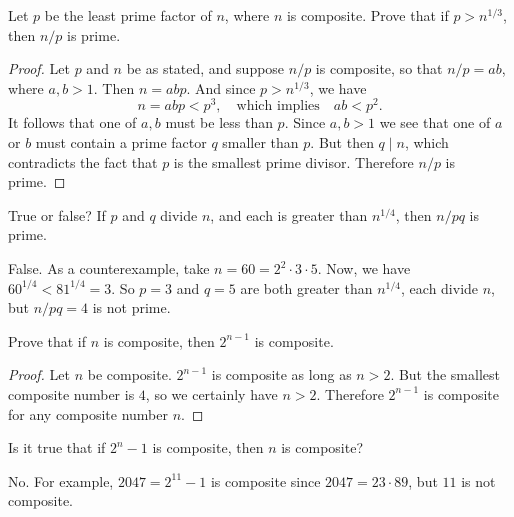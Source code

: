  Let $p$ be the least prime factor of $n$, where $n$ is
composite. Prove that if $p > n^{1/3}$, then $n/p$ is prime.
\begin{proof}
  Let $p$ and $n$ be as stated, and suppose $n/p$ is composite, so
  that $n/p = ab$, where $a,b > 1$. Then $n = abp$. And since
  $p > n^{1/3}$, we have
  \begin{equation*}
    n = abp < p^3,
    \quad\text{which implies}\quad
    ab < p^2.
  \end{equation*}
  It follows that one of $a,b$ must be less than $p$. Since $a,b > 1$
  we see that one of $a$ or $b$ must contain a prime factor $q$
  smaller than $p$. But then $q\mid n$, which contradicts the fact
  that $p$ is the smallest prime divisor. Therefore $n/p$ is prime.
\end{proof}

 True or false? If $p$ and $q$ divide $n$, and each is
greater than $n^{1/4}$, then $n/pq$ is prime.
\begin{solution}
  False. As a counterexample, take $n = 60 = 2^2\cdot3\cdot5$. Now, we
  have $60^{1/4} < 81^{1/4} = 3$. So $p = 3$ and $q = 5$ are both
  greater than $n^{1/4}$, each divide $n$, but $n/pq = 4$ is not
  prime.
\end{solution}

 Prove that if $n$ is composite, then $2^{n-1}$ is
composite.
\begin{proof}
  Let $n$ be composite. $2^{n-1}$ is composite as long as $n > 2$. But
  the smallest composite number is $4$, so we certainly have $n >
  2$. Therefore $2^{n-1}$ is composite for any composite number $n$.
\end{proof}

 Is it true that if $2^n - 1$ is composite, then $n$ is
composite?
\begin{solution}
  No. For example, $2047 = 2^{11} - 1$ is composite since
  $2047 = 23\cdot89$, but $11$ is not composite.
\end{solution}
